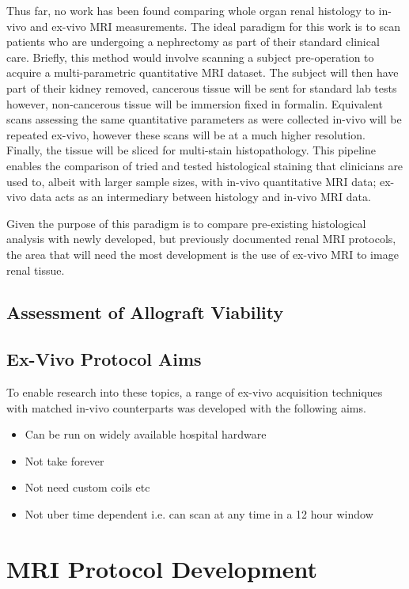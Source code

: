 Thus far, no work has been found comparing whole organ renal histology to in-vivo and ex-vivo \ac{MRI} measurements. The ideal paradigm for this work is to scan patients who are undergoing a nephrectomy as part of their standard clinical care. Briefly, this method would involve scanning a subject pre-operation to acquire a multi-parametric quantitative \ac{MRI} dataset. The subject will then have part of their kidney removed, cancerous tissue will be sent for standard lab tests however, non-cancerous tissue will be immersion fixed in formalin. Equivalent scans assessing the same quantitative parameters as were collected in-vivo will be repeated ex-vivo, however these scans will be at a much higher resolution. Finally, the tissue will be sliced for multi-stain histopathology. This pipeline enables the comparison of tried and tested histological staining that clinicians are used to, albeit with larger sample sizes, with in-vivo quantitative \ac{MRI} data; ex-vivo data acts as an intermediary between histology and in-vivo \ac{MRI} data.

Given the purpose of this paradigm is to compare pre-existing histological analysis with newly developed, but previously documented renal \ac{MRI} protocols, the area that will need the most development is the use of ex-vivo \ac{MRI} to image renal tissue.

\subsection{Assessment of Allograft Viability}

\subsection{Ex-Vivo Protocol Aims}
To enable research into these topics, a range of ex-vivo acquisition techniques with matched in-vivo counterparts was developed with the following aims.

\begin{itemize}
	\item Can be run on widely available hospital hardware
	\item Not take forever
	\item Not need custom coils etc
	\item Not uber time dependent i.e. can scan at any time in a 12 hour window
\end{itemize}

\section{MRI Protocol Development}

